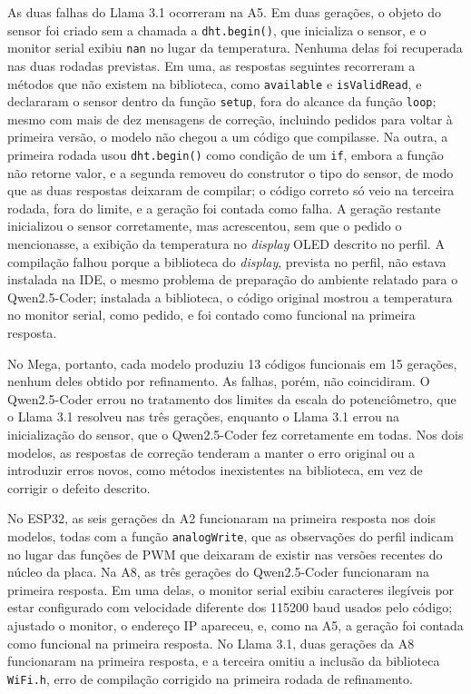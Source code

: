 As duas falhas do Llama 3.1 ocorreram na A5. Em duas gerações, o objeto do sensor foi criado sem a chamada a \texttt{dht.begin()}, que inicializa o sensor, e o monitor serial exibiu \texttt{nan} no lugar da temperatura. Nenhuma delas foi recuperada nas duas rodadas previstas. Em uma, as respostas seguintes recorreram a métodos que não existem na biblioteca, como \texttt{available} e \texttt{isValidRead}, e declararam o sensor dentro da função \texttt{setup}, fora do alcance da função \texttt{loop}; mesmo com mais de dez mensagens de correção, incluindo pedidos para voltar à primeira versão, o modelo não chegou a um código que compilasse. Na outra, a primeira rodada usou \texttt{dht.begin()} como condição de um \texttt{if}, embora a função não retorne valor, e a segunda removeu do construtor o tipo do sensor, de modo que as duas respostas deixaram de compilar; o código correto só veio na terceira rodada, fora do limite, e a geração foi contada como falha. A geração restante inicializou o sensor corretamente, mas acrescentou, sem que o pedido o mencionasse, a exibição da temperatura no \textit{display} OLED descrito no perfil. A compilação falhou porque a biblioteca do \textit{display}, prevista no perfil, não estava instalada na IDE, o mesmo problema de preparação do ambiente relatado para o Qwen2.5-Coder; instalada a biblioteca, o código original mostrou a temperatura no monitor serial, como pedido, e foi contado como funcional na primeira resposta.

No Mega, portanto, cada modelo produziu 13 códigos funcionais em 15 gerações, nenhum deles obtido por refinamento. As falhas, porém, não coincidiram. O Qwen2.5-Coder errou no tratamento dos limites da escala do potenciômetro, que o Llama 3.1 resolveu nas três gerações, enquanto o Llama 3.1 errou na inicialização do sensor, que o Qwen2.5-Coder fez corretamente em todas. Nos dois modelos, as respostas de correção tenderam a manter o erro original ou a introduzir erros novos, como métodos inexistentes na biblioteca, em vez de corrigir o defeito descrito.

No ESP32, as seis gerações da A2 funcionaram na primeira resposta nos dois modelos, todas com a função \texttt{analogWrite}, que as observações do perfil indicam no lugar das funções de PWM que deixaram de existir nas versões recentes do núcleo da placa. Na A8, as três gerações do Qwen2.5-Coder funcionaram na primeira resposta. Em uma delas, o monitor serial exibiu caracteres ilegíveis por estar configurado com velocidade diferente dos 115200 baud usados pelo código; ajustado o monitor, o endereço IP apareceu, e, como na A5, a geração foi contada como funcional na primeira resposta. No Llama 3.1, duas gerações da A8 funcionaram na primeira resposta, e a terceira omitiu a inclusão da biblioteca \texttt{WiFi.h}, erro de compilação corrigido na primeira rodada de refinamento.

